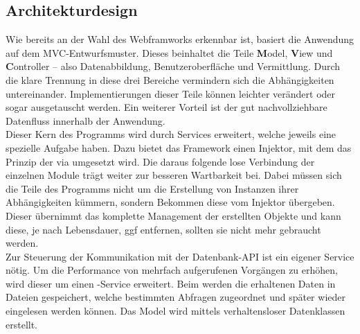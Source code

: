 \subsection{Architekturdesign}
\label{sec:Architekturdesign}
Wie bereits an der Wahl des Webframworks erkennbar ist, basiert die Anwendung auf dem \acs{MVC}-Entwurfsmuster.
Dieses beinhaltet die Teile \textbf{M}odel, \textbf{V}iew und \textbf{C}ontroller -- also Datenabbildung, 
Benutzeroberfläche und Vermittlung. Durch die klare Trennung in diese drei Bereiche vermindern sich
die Abhängigkeiten untereinander. Implementierungen dieser Teile können leichter verändert oder sogar ausgetauscht werden.
Ein weiterer Vorteil ist der gut nachvollziehbare Datenfluss innerhalb der Anwendung.\\
Dieser Kern des Programms wird durch Services erweitert, welche jeweils eine spezielle Aufgabe haben.
Dazu bietet das Framework einen Injektor, mit dem das Prinzip der  via 
 umgesetzt wird. Die daraus folgende lose Verbindung der einzelnen Module
trägt weiter zur besseren Wartbarkeit bei. Dabei müssen sich die Teile des Programms nicht um die Erstellung von
Instanzen ihrer Abhängigkeiten kümmern, sondern Bekommen diese vom Injektor übergeben. Dieser übernimmt
das komplette Management der erstellten Objekte und kann diese, je nach Lebensdauer, \acs{ggf} entfernen, sollten sie nicht mehr 
gebraucht werden.\\
Zur Steuerung der Kommunikation mit der Datenbank-API ist ein eigener Service nötig. Um die Performance von
mehrfach aufgerufenen Vorgängen zu erhöhen, wird dieser um einen -Service erweitert.
Beim  werden die erhaltenen Daten in Dateien gespeichert, welche bestimmten Abfragen
zugeordnet und später wieder eingelesen werden können.
Das Model wird mittels verhaltensloser Datenklassen erstellt. 

